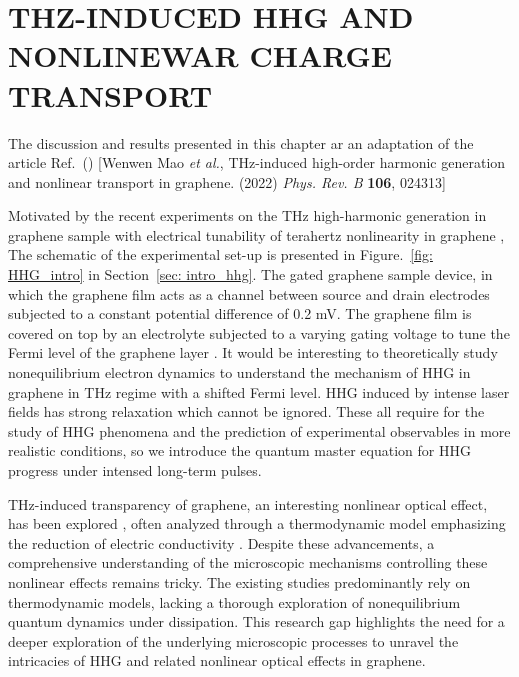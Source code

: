 \chapter{THZ-INDUCED HHG AND NONLINEWAR CHARGE TRANSPORT \label{ch:ch4}}
The discussion and results presented in this chapter ar an adaptation of the article Ref.~(\cite{mao2022terahertz}) [Wenwen Mao \emph{et al.}, THz-induced high-order harmonic generation and nonlinear transport in graphene. (2022) {\it Phys. Rev. B} \textbf{106}, 024313]

\color{red}
Motivated by the recent experiments on the THz high-harmonic generation in graphene sample with electrical tunability of terahertz nonlinearity in graphene \cite{hafez2014nonlinear, kovalev2021electrical}, The schematic of the experimental set-up is presented in Figure.~\ref{fig: HHG_intro} in Section~\ref{sec: intro_hhg}. The gated graphene sample device, in which the graphene film acts as a channel between source and drain electrodes subjected to a constant potential difference of 0.2 mV. The graphene film is covered on top by an electrolyte subjected to a varying gating voltage to tune the Fermi level of the graphene layer \cite{kovalev2021electrical}. It would be interesting to theoretically study nonequilibrium electron dynamics to understand the mechanism of HHG in graphene in THz regime with a shifted Fermi level.
HHG induced by intense laser fields has strong relaxation which cannot be ignored. These all require for the study of \gls{HHG} phenomena and the prediction of experimental observables in more realistic conditions, so we introduce the quantum master equation for HHG progress under intensed long-term pulses.
\color{black}

THz-induced transparency of graphene, an interesting nonlinear optical effect, has been explored \cite{Hwang2013,Paul_2013,doi:10.1063/1.4902999}, often analyzed through a thermodynamic model emphasizing the reduction of electric conductivity \cite{mics2015thermodynamic,kovalev2021electrical}.
Despite these advancements, a comprehensive understanding of the microscopic mechanisms controlling these nonlinear effects remains tricky. The existing studies predominantly rely on thermodynamic models, lacking a thorough exploration of nonequilibrium quantum dynamics under dissipation. This research gap highlights the need for a deeper exploration of the underlying microscopic processes to unravel the intricacies of HHG and related nonlinear optical effects in graphene.

